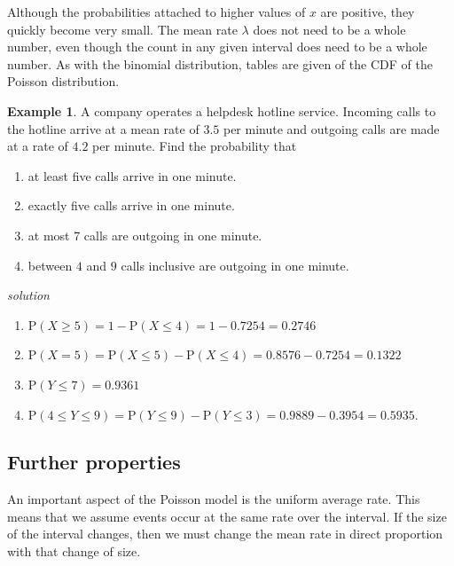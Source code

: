 \documentclass[
]{book}
\theoremstyle{definition}
\theoremstyle{definition}
\newtheorem{example}{Example}[chapter]
\theoremstyle{definition}
\theoremstyle{definition}
\theoremstyle{remark}
\begin{document}
Although the probabilities attached to higher values of \(x\) are positive, they quickly become very small. The mean rate \(\lambda\) does not need to be a whole number, even though the count in any given interval does need to be a whole number. As with the binomial distribution, tables are given of the CDF of the Poisson distribution.

\begin{example}

A company operates a helpdesk hotline service. Incoming calls to the hotline arrive at a mean rate of \(3.5\) per minute and outgoing calls are made at a rate of \(4.2\) per minute. Find the probability that

\begin{enumerate}
\def\labelenumi{\alph{enumi})}
\item
  at least five calls arrive in one minute.
\item
  exactly five calls arrive in one minute.
\item
  at most 7 calls are outgoing in one minute.
\item
  between \(4\) and \(9\) calls inclusive are outgoing in one minute.
\end{enumerate}

\emph{solution}

\begin{enumerate}
\def\labelenumi{\alph{enumi})}
\item
  \(\text{P}(X\geq 5) = 1 - \text{P}(X\leq 4) = 1-0.7254 = 0.2746\)
\item
  \(\text{P}(X=5) = \text{P}(X\leq 5) - \text{P}(X\leq 4) = 0.8576 - 0.7254 = 0.1322\)
\item
  \(\text{P}(Y\leq 7) = 0.9361\)
\item
  \(\text{P}(4\leq Y \leq 9 ) = \text{P}(Y\leq 9) - \text{P}(Y\leq 3) = 0.9889 - 0.3954 = 0.5935\).
\end{enumerate}

\end{example}

\hypertarget{further-properties}{%
\subsection{Further properties}\label{further-properties}}

An important aspect of the Poisson model is the uniform average rate. This means that we assume events occur at the same rate over the interval. If the size of the interval changes, then we must change the mean rate in direct proportion with that change of size.
\end{document}
